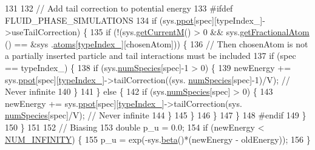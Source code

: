 \begin{DoxyCode}
131 
132             \textcolor{comment}{// Add tail correction to potential energy}
133 \textcolor{preprocessor}{    #ifdef FLUID\_PHASE\_SIMULATIONS}
134 \textcolor{preprocessor}{}            \textcolor{keywordflow}{if} (sys.\hyperlink{classsim_system_ad2e290b5963f132e6a3a56cee35c8e9f}{ppot}[spec][typeIndex\_]->useTailCorrection) \{
135                 \textcolor{keywordflow}{if} (!(sys.\hyperlink{classsim_system_a299fe4372e610b554eaaf5f5957b2dbc}{getCurrentM}() > 0 && sys.\hyperlink{classsim_system_a2ab77377c60e0e3109a6e875690b0ab7}{getFractionalAtom} () == &sys
      .\hyperlink{classsim_system_a90421b19082f7fb8fc23b7264b1161e4}{atoms}[\hyperlink{classmc_move_acb731965547b0326ef318ec96da8b46a}{typeIndex\_}][chosenAtom])) \{
136                     \textcolor{comment}{// Then chosenAtom is not a partially inserted particle and tail interactions must be
       included}
137                     \textcolor{keywordflow}{if} (spec == typeIndex\_) \{
138                         \textcolor{keywordflow}{if} (sys.\hyperlink{classsim_system_a9eea865e6dc1cff377b1e79c4d9c23f0}{numSpecies}[spec]-1 > 0) \{
139                             newEnergy += sys.\hyperlink{classsim_system_ad2e290b5963f132e6a3a56cee35c8e9f}{ppot}[spec][\hyperlink{classmc_move_acb731965547b0326ef318ec96da8b46a}{typeIndex\_}]->tailCorrection((sys.
      \hyperlink{classsim_system_a9eea865e6dc1cff377b1e79c4d9c23f0}{numSpecies}[spec]-1)/V); \textcolor{comment}{// Never infinite}
140                         \}
141                     \} \textcolor{keywordflow}{else} \{
142                         \textcolor{keywordflow}{if} (sys.\hyperlink{classsim_system_a9eea865e6dc1cff377b1e79c4d9c23f0}{numSpecies}[spec] > 0) \{
143                             newEnergy += sys.\hyperlink{classsim_system_ad2e290b5963f132e6a3a56cee35c8e9f}{ppot}[spec][\hyperlink{classmc_move_acb731965547b0326ef318ec96da8b46a}{typeIndex\_}]->tailCorrection(sys.
      \hyperlink{classsim_system_a9eea865e6dc1cff377b1e79c4d9c23f0}{numSpecies}[spec]/V); \textcolor{comment}{// Never infinite}
144                         \}
145                     \}
146                 \}
147             \}
148 \textcolor{preprocessor}{    #endif}
149 \textcolor{preprocessor}{}        \}
150     \}
151 
152     \textcolor{comment}{// Biasing}
153     \textcolor{keywordtype}{double} p\_u = 0.0;
154     \textcolor{keywordflow}{if} (newEnergy < \hyperlink{potentials_8h_ab94ab1d09e2291d03fe92a0e24a9d33b}{NUM\_INFINITY}) \{
155         p\_u = exp(-sys.\hyperlink{classsim_system_a3eeec9678902f8d7fce4dad6064aaf4c}{beta}()*(newEnergy - oldEnergy));
156     \}

\end{DoxyCode}
